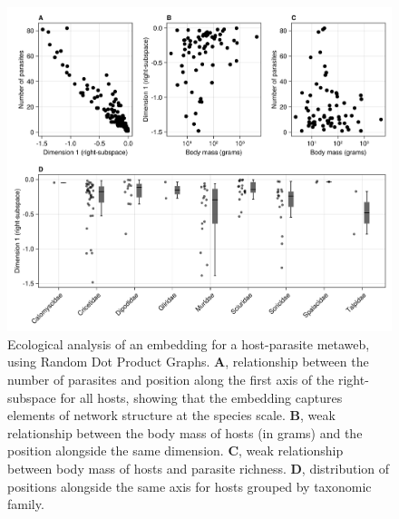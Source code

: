 \begin{refsection}
\begin{figure}[h]
    \centering
    \includegraphics[width=\textwidth]{figures/illustration-part2.png}
    \caption{Ecological analysis of an embedding for a host-parasite
metaweb, using Random Dot Product Graphs. \textbf{A}, relationship
between the number of parasites and position along the first axis of the
right-subspace for all hosts, showing that the embedding captures
elements of network structure at the species scale. \textbf{B}, weak
relationship between the body mass of hosts (in grams) and the position
alongside the same dimension. \textbf{C}, weak relationship between body
mass of hosts and parasite richness. \textbf{D}, distribution of
positions alongside the same axis for hosts grouped by taxonomic
family.}
    \label{fig:illustration2}
\end{figure}


\end{refsection}
